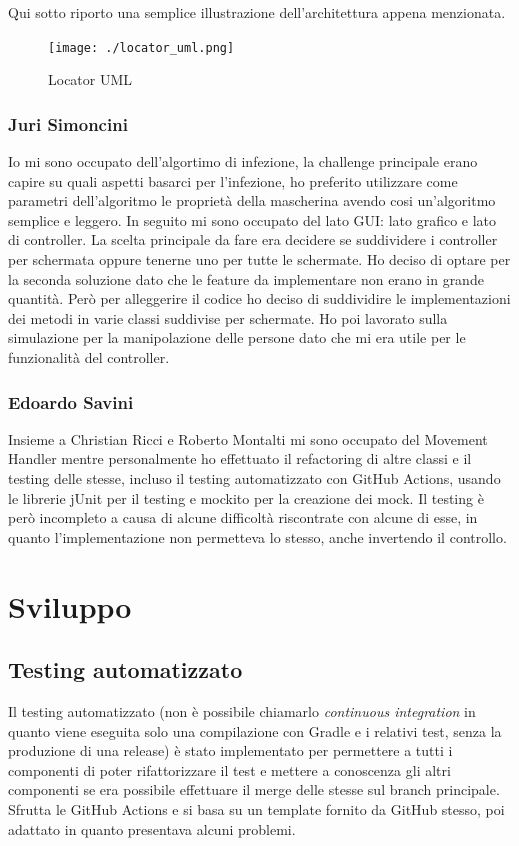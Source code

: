 \documentclass[a4paper,12pt]{report}
\begin{document}
Qui sotto riporto una semplice illustrazione dell'architettura appena menzionata.

\begin{figure}[h]
\centering{}
\texttt{[image: ./locator\_uml.png]}
\caption{Locator UML}
\label{img:Locator UML}
\end{figure}

\subsection{Juri Simoncini}
Io mi sono occupato dell'algortimo di infezione, la challenge principale erano capire su quali aspetti basarci per l'infezione, 
ho preferito utilizzare come parametri dell'algoritmo le proprietà della mascherina avendo cosi un'algoritmo semplice e leggero.
In seguito mi sono occupato del lato GUI: lato grafico e lato di controller.
La scelta principale da fare era decidere se suddividere i controller per schermata oppure tenerne uno per tutte le schermate.
Ho deciso di optare per la seconda soluzione dato che le feature da implementare non erano in grande quantità.
Però per alleggerire il codice ho deciso di suddividire le implementazioni dei metodi in varie classi suddivise per schermate.
Ho poi lavorato sulla simulazione per la manipolazione delle persone dato che mi era utile per le funzionalità del controller.

\subsection{Edoardo Savini}
Insieme a Christian Ricci e Roberto Montalti mi sono occupato del Movement Handler mentre personalmente ho effettuato il refactoring di altre classi e il testing delle stesse, incluso il testing automatizzato con GitHub Actions, usando le librerie jUnit per il testing e mockito per la creazione dei mock. Il testing è però incompleto a causa di alcune difficoltà riscontrate con alcune di esse, in quanto l'implementazione non permetteva lo stesso, anche invertendo il controllo.

\chapter{Sviluppo}

\section{Testing automatizzato}

Il testing automatizzato (non è possibile chiamarlo \emph{continuous integration} in quanto viene eseguita solo una compilazione con Gradle e i relativi test, senza la produzione di una release) è stato implementato per permettere a tutti i componenti di poter rifattorizzare il test e mettere a conoscenza gli altri componenti se era possibile effettuare il merge delle stesse sul branch principale. Sfrutta le GitHub Actions e si basa su un template fornito da GitHub stesso, poi adattato in quanto presentava alcuni problemi.
\end{document}
